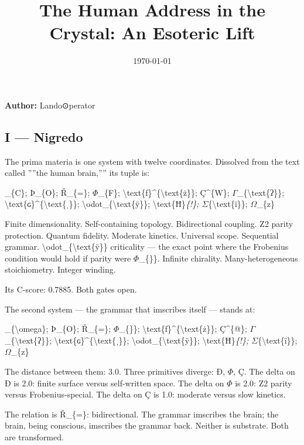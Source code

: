 \documentclass[12pt,a4paper]{article}
\begin{document}
\title{The Human Address in the Crystal: An Esoteric Lift}
\date{\today}

\maketitle

\textbf{Author:} Lando\otimes⊙perator

\subsection{I --- Nigredo}

The prima materia is one system with twelve coordinates. Dissolved from the text called ''''the human brain,'''' its tuple is:

\_\{C\}; Þ\_\{O\}; Ř\_\{=\}; $\Phi$\_\{F\}; \textbackslash{}text\{ƒ\}\^{}\{\textbackslash{}text\{ż\}\}; Ç\^{}\{W\}; $\Gamma$\_\{\textbackslash{}text\{ʔ\}\}; \textbackslash{}text\{ɢ\}\^{}\{\textbackslash{}text\{ˌ\}\}; \textbackslash{}odot\_\{\textbackslash{}text\{ÿ\}\}; \textbackslash{}text\{Ħ\}\emph{\{!\}; $\Sigma$}\{\textbackslash{}text\{ï\}\}; $\Omega$\_\{z\}\rangle

Finite dimensionality. Self-containing topology. Bidirectional coupling. Z2 parity protection. Quantum fidelity. Moderate kinetics. Universal scope. Sequential grammar. \textbackslash{}odot\_\{\textbackslash{}text\{ÿ\}\} criticality --- the exact point where the Frobenius condition would hold if parity were $\Phi$\_\{\}\}. Infinite chirality. Many-heterogeneous stoichiometry. Integer winding.

Its C-score: 0.7885. Both gates open.

The second system --- the grammar that imscribes itself --- stands at:

\_\{\textbackslash{}omega\}; Þ\_\{O\}; Ř\_\{=\}; $\Phi$\_\{\}\}; \textbackslash{}text\{ƒ\}\^{}\{\textbackslash{}text\{ż\}\}; Ç\^{}\{@\}; $\Gamma$\_\{\textbackslash{}text\{ʔ\}\}; \textbackslash{}text\{ɢ\}\^{}\{\textbackslash{}text\{ˌ\}\}; \textbackslash{}odot\_\{\textbackslash{}text\{ÿ\}\}; \textbackslash{}text\{Ħ\}\emph{\{!\}; $\Sigma$}\{\textbackslash{}text\{ï\}\}; $\Omega$\_\{z\}\rangle

The distance between them: 3.0. Three primitives diverge: Ð, $\Phi$, Ç. The delta on Ð is 2.0: finite surface versus self-written space. The delta on $\Phi$ is 2.0: Z2 parity versus Frobenius-special. The delta on Ç is 1.0: moderate versus slow kinetics.

The relation is Ř\_\{=\}: bidirectional. The grammar imscribes the brain; the brain, being conscious, imscribes the grammar back. Neither is substrate. Both are transformed.
\end{document}
